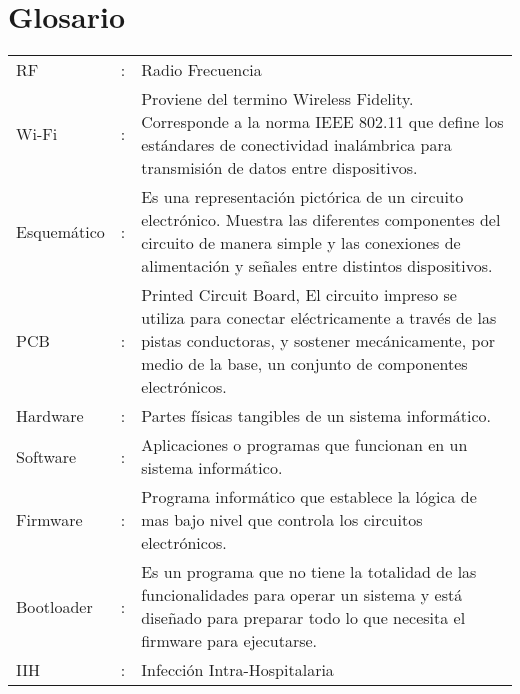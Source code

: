 

\section*{Glosario}

\begin{tabular}{lcp{10.5cm}}
RF &:& Radio Frecuencia\\
	
Wi-Fi &:& Proviene del termino Wireless Fidelity. Corresponde a la norma IEEE 802.11
que define los estándares de conectividad inalámbrica para transmisión de datos entre dispositivos.\\


Esquemático &:& Es una representación pictórica de un circuito electrónico. Muestra las diferentes componentes del circuito de manera simple y las conexiones de alimentación y señales entre distintos dispositivos.\\
PCB &:& Printed Circuit Board, El circuito impreso se utiliza para conectar eléctricamente a través de las pistas conductoras, y sostener mecánicamente, por medio de la base, un conjunto de componentes electrónicos.\\
Hardware &:& Partes físicas tangibles de un sistema informático.\\
Software &:& Aplicaciones o programas que funcionan en un sistema informático.\\
Firmware &:& Programa informático que establece la lógica de mas bajo nivel que controla los circuitos electrónicos.\\
Bootloader &:& Es un programa que no tiene la totalidad de las funcionalidades para operar un sistema y está diseñado para preparar todo lo que necesita el firmware para ejecutarse.\\
IIH &:& Infección Intra-Hospitalaria
\end{tabular}

